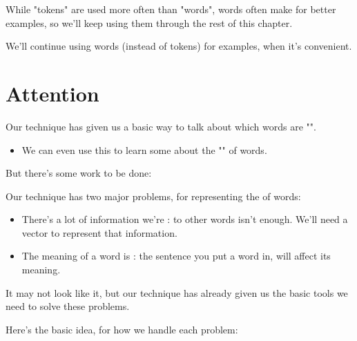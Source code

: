         While "tokens" are used more often than "words", words often make for better examples, so we'll keep using them through the rest of this chapter.\\

        \begin{clarification}
            We'll continue using words (instead of tokens) for examples, when it's convenient.
        \end{clarification}

    

\pagebreak
    
\section{Attention}

    Our  technique has given us a basic way to talk about which words are "".

    \begin{itemize}
        \item We can even use this to learn some about the "" of words.
    \end{itemize}

    But there's some work to be done:\\

    \begin{concept}
        Our  technique has two major problems, for representing the  of words:

        \begin{itemize}
            \item There's a lot of information we're :  to other words isn't enough. We'll need a vector to represent that information.
    
            \item The meaning of a word is : the sentence you put a word in, will affect its meaning.
        \end{itemize}
    \end{concept}

    

    It may not look like it, but our  technique has already given us the basic tools we need to solve these problems.

    Here's the basic idea, for how we handle each problem:\\

